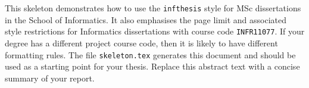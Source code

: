 This skeleton demonstrates how to use the \texttt{infthesis} style for
MSc dissertations in the School of Informatics. It also emphasises the
page limit and associated style restrictions for Informatics dissertations
with course code \texttt{INFR11077}. If your degree has a different project
course code, then it is likely to have different formatting rules.
The file \texttt{skeleton.tex} generates this document and should be used as a
starting point for your thesis. Replace this abstract text with a concise
summary of your report.